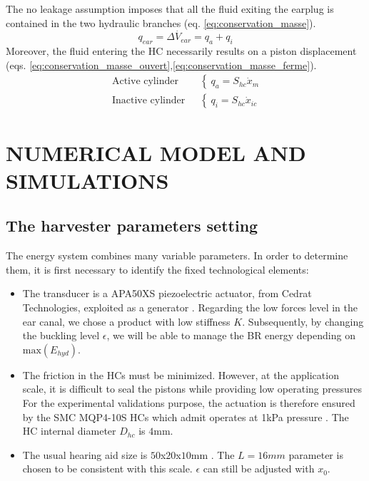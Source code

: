 \documentclass[3p,twocolumn,preprint]{elsarticle}
\begin{document}
The no leakage assumption imposes that all the fluid exiting the earplug is contained in the two hydraulic branches (eq. \ref{eq:conservation_masse}).
\begin{equation}
	q_{ear} = \dot{\Delta V_{ear}} = q_a + q_i
	\label{eq:conservation_masse}
\end{equation}
Moreover, the fluid entering the HC necessarily results on a piston displacement (eqs. \ref{eq:conservation_masse_ouvert},\ref{eq:conservation_masse_ferme}).
\begin{align}
	\text{Active cylinder ~}& \left\{~
	q_a = S_{hc} \dot{x}_m
	\right.
	\label{eq:conservation_masse_ouvert}\\
	\text{Inactive cylinder ~}& \left\{~
	q_i = S_{hc} \dot{x}_{ic}
	\right.
	\label{eq:conservation_masse_ferme}
\end{align}
\section{NUMERICAL MODEL AND SIMULATIONS}
\label{NUMERICAL MODEL AND SIMULATIONS}
	\subsection{The harvester parameters setting}	
	\label{subsec:The harvester setting}
The energy system combines many variable parameters. In order to determine them, it is first necessary to identify the fixed technological elements: 
\begin{itemize}
	\item The transducer is a APA50XS piezoelectric actuator, from Cedrat Technologies, exploited as a generator \cite{CEDRATTECHNOLOGIES2022}. Regarding the low forces level in the ear canal, we chose a product with low stiffness $K$. Subsequently, by changing the buckling level $\epsilon$, we will be able to manage the BR energy depending on $\text{max}(E_{hyd})$.
	\item The friction in the HCs must be minimized. However, at the application scale, it is difficult to seal the pistons while providing low operating pressures For the experimental validations purpose, the actuation is therefore ensured by the SMC MQP4-10S HCs which admit operates at 1kPa pressure \cite{SMC2022}. The HC internal diameter $D_{hc}$ is $4$mm.
	\item The usual hearing aid size is $50$x$20$x$10$mm \cite{Quattro2019}. The \mbox{$L=16mm$} parameter is chosen to be consistent with this scale. $\epsilon$ can still be adjusted with $x_0$.
\end{itemize}
\end{document}
